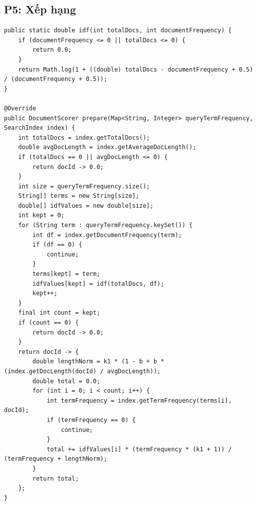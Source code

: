 \documentclass[9pt,twocolumn,a4paper]{extarticle}
\newcommand{\code}[1]{\texttt{#1}}
\begin{document}
\subsection{P5: Xếp hạng}
\begin{minipage}{\linewidth}
\begin{lstlisting}[caption={\code{ranking/BM25Scorer.java}, \code{idf}, \code{prepare}: tính idf một lần, chấm từng tài liệu},label={lst:bm25}]
public static double idf(int totalDocs, int documentFrequency) {
    if (documentFrequency <= 0 || totalDocs <= 0) {
        return 0.0;
    }
    return Math.log(1 + ((double) totalDocs - documentFrequency + 0.5) / (documentFrequency + 0.5));
}

@Override
public DocumentScorer prepare(Map<String, Integer> queryTermFrequency, SearchIndex index) {
    int totalDocs = index.getTotalDocs();
    double avgDocLength = index.getAverageDocLength();
    if (totalDocs == 0 || avgDocLength <= 0) {
        return docId -> 0.0;
    }
    int size = queryTermFrequency.size();
    String[] terms = new String[size];
    double[] idfValues = new double[size];
    int kept = 0;
    for (String term : queryTermFrequency.keySet()) {
        int df = index.getDocumentFrequency(term);
        if (df == 0) {
            continue;
        }
        terms[kept] = term;
        idfValues[kept] = idf(totalDocs, df);
        kept++;
    }
    final int count = kept;
    if (count == 0) {
        return docId -> 0.0;
    }
    return docId -> {
        double lengthNorm = k1 * (1 - b + b * (index.getDocLength(docId) / avgDocLength));
        double total = 0.0;
        for (int i = 0; i < count; i++) {
            int termFrequency = index.getTermFrequency(terms[i], docId);
            if (termFrequency == 0) {
                continue;
            }
            total += idfValues[i] * (termFrequency * (k1 + 1)) / (termFrequency + lengthNorm);
        }
        return total;
    };
}
\end{lstlisting}
\end{minipage}
\par\vspace{4pt}
\end{document}
